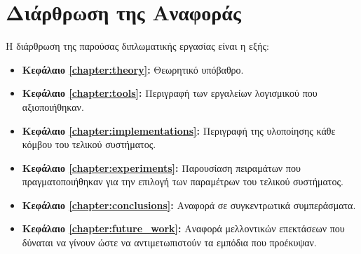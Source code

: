 \section{Διάρθρωση της Αναφοράς}
\label{section:layout}

Η διάρθρωση της παρούσας διπλωματικής εργασίας είναι η εξής:
\begin{itemize}
    \item{\textbf{Κεφάλαιο \ref{chapter:theory}:}
    Θεωρητικό υπόβαθρο.
    }
    \item{\textbf{Κεφάλαιο \ref{chapter:tools}:}
    Περιγραφή των εργαλείων λογισμικού που αξιοποιήθηκαν.
    }
    \item{\textbf{Κεφάλαιο \ref{chapter:implementations}:}
    Περιγραφή της υλοποίησης κάθε κόμβου του τελικού συστήματος.
    }
    \item{\textbf{Κεφάλαιο \ref{chapter:experiments}:}
        Παρουσίαση πειραμάτων που πραγματοποιήθηκαν για την επιλογή των παραμέτρων του τελικού συστήματος.
    }
    \item{\textbf{Κεφάλαιο \ref{chapter:conclusions}:}
        Αναφορά σε συγκεντρωτικά συμπεράσματα.
    }
    \item{\textbf{Κεφάλαιο \ref{chapter:future_work}:}
        Αναφορά μελλοντικών επεκτάσεων που δύναται να γίνουν ώστε να αντιμετωπιστούν
        τα εμπόδια που προέκυψαν.
    }
\end{itemize}
